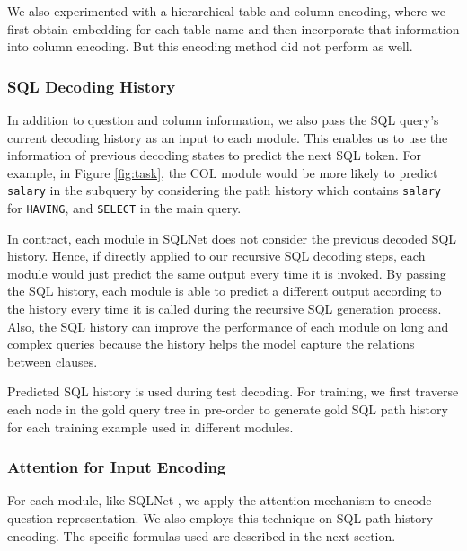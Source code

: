 \documentclass[11pt,a4paper]{article}
\begin{document}
We also experimented with a hierarchical table and column encoding, where we first obtain embedding for each table name and then incorporate that information into column encoding. But this encoding method did not perform as well. 

\subsubsection{SQL Decoding History}
\label{sec:hist_path}

In addition to question and column information, we also pass the SQL query's current decoding history as an input to each module. This enables us to use the information of previous decoding states to predict the next SQL token. For example, in Figure \ref{fig:task}, the COL module would be more likely to predict \texttt{salary} in the subquery by considering the path history which contains \texttt{salary} for \texttt{HAVING}, and  \texttt{SELECT} in the main query.

In contract, each module in SQLNet does not consider the previous decoded SQL history. 
Hence, if directly applied to our recursive SQL decoding steps, each module would just predict the same output every time it is invoked.
By passing the SQL history, each module is able to predict a different output according to the history every time it is called during the recursive SQL generation process. Also, the SQL history can improve the performance of each module on long and complex queries because the history helps the model capture the relations between clauses.

Predicted SQL history is used during test decoding.
For training, we first traverse each node in the gold query tree in pre-order to generate gold SQL path history for each training example used in different modules.

\subsubsection{Attention for Input Encoding}
\label{sec:col_emb}






For each module, like SQLNet \cite{Xu2017}, we apply the attention mechanism to encode question representation. We also employs this technique on SQL path history encoding. 
The specific formulas used are described in the next section.
\end{document}
